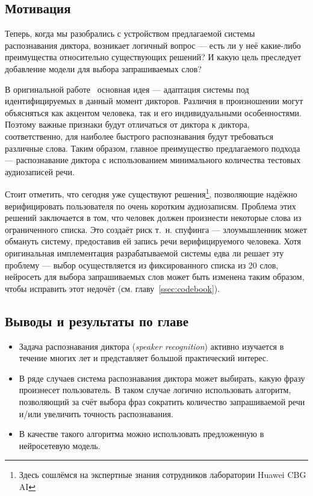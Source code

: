 \subsection{Мотивация}\label{ssec:ytho}

Теперь, когда мы разобрались с устройством предлагаемой системы распознавания
диктора, возникает логичный вопрос --- есть ли у неё какие-либо преимущества
относительно существующих решений? И какую цель преследует добавление модели для
выбора запрашиваемых слов?

В оригинальной работе~\citeisr{} основная идея --- адаптация системы под
идентифицируемых в данный момент дикторов. Различия в произношении могут
объясняться как акцентом человека, так и его индивидуальными особенностями.
Поэтому важные признаки будут отличаться от диктора к диктора, соответственно,
для наиболее быстрого распознавания будут требоваться различные слова. Таким
образом, главное преимущество предлагаемого подхода --- распознавание диктора с
использованием минимального количества тестовых аудиозаписей речи.

Стоит отметить, что сегодня уже существуют решения\footnote{
    Здесь сошлёмся на экспертные знания сотрудников лаборатории Huawei CBG AI
}, позволяющие надёжно верифицировать пользователя по очень коротким
аудиозаписям. Проблема этих решений заключается в том, что человек должен
произнести некоторые слова из ограниченного списка. Это создаёт риск т.~н.
спуфинга --- злоумышленник может обмануть систему, предоставив ей запись речи
верифицируемого человека. Хотя оригинальная имплементация разрабатываемой
системы едва ли решает эту проблему --- выбор осуществляется из фиксированного
списка из 20 слов, нейросеть для выбора запрашиваемых слов может быть изменена
таким образом, чтобы исправить этот недочёт (см. главу~\ref{ssec:codebook}).

\subsection{Выводы и результаты по главе}

\begin{itemize}
    \item Задача распознавания диктора (\textit{speaker recognition}) активно
    изучается в течение многих лет и представляет большой практический интерес.
    \item В ряде случаев система распознавания диктора может выбирать, какую
    фразу произнесет пользователь. В таком случае логично использовать алгоритм,
    позволяющий за счёт выбора фраз сократить количество запрашиваемой речи и/или
    увеличить точность распознавания.
    \item В качестве такого алгоритма можно использовать предложенную в \citeisr{}
    нейросетевую модель.
\end{itemize}